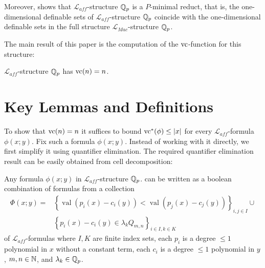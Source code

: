 \documentclass{amsart}
\renewcommand{\LL}{\mathcal L}
\newcommand{\LLA}{\mathcal L_{aff}}
\newcommand{\LLM}{\mathcal L_{Mac}}
\newcommand{\curly}[1]{\left\{#1\right\}}
\DeclareMathOperator{\vval}{val}
\begin{document}
Moreover, \cite{reduct} shows that $\LLA$-structure $\mathbb{Q}_p$ is a $P$-minimal reduct,
that is, the one-dimensional definable sets of $\LLA$-structure $\mathbb{Q}_p$
coincide with the one-dimensional definable sets in the full structure $\LLM$-structure $\mathbb{Q}_p$.

The main result of this paper is the computation of the $\operatorname{vc}$-function for this structure:
\begin{Theorem} \label{main_theorem}
  $\LLA$-structure $\mathbb{Q}_p$ has $\operatorname{vc}(n) = n$.
\end{Theorem}


\section{Key Lemmas and Definitions}




To show that $\operatorname{vc}(n) = n$ it suffices to bound $\operatorname{vc}^*(\phi) \leq |x|$ for every $\LL_{aff}$-formula $\phi(x; y)$.
Fix such a formula $\phi(x; y)$.
Instead of working with it directly, we first simplify it using quantifier elimination.
The required quantifier elimination result can be easily obtained from cell decomposition:
\begin{Lemma} \label {quantifier_elimination}
  Any formula $\phi(x; y)$ in $\LLA$-structure $\mathbb{Q}_p$. can be written as a boolean combination of formulas from a collection
  \begin{align*}
    \Phi(x; y) = &\curly{\vval (p_i(x) - c_i(y)) < \vval (p_j(x) - c_j(y))}_{i, j \in I} \cup \\
                 &\curly{p_i(x) - c_i(y) \in \lambda_k Q_{m,n}}_{i \in I , k \in K}
  \end{align*}
  of $\LLA$-formulas
  where $I, K$ are finite index sets,
  each $p_i$ is a degree $\leq 1$ polynomial in $x$ without a constant term,
  each $c_i$ is a degree $\leq 1$ polynomial in $y$,
  $m,n \in \mathbb{N}$,
  and
  $\lambda_k \in \mathbb{Q}_p$.
\end{Lemma}
\end{document}
